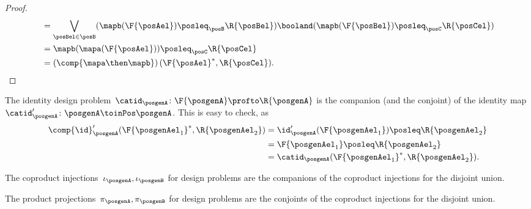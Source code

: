 \begin{proof}
\begin{equation}
\begin{aligned}
            &=\bigvee_{\posBel\in \posB} (\mapb(\F{\posAel})\posleq_\posB \R{\posBel})\booland (\mapb(\F{\posBel})\posleq_\posC \R{\posCel})\\
            &=\mapb(\mapa(\F{\posAel}))\posleq_\posC \R{\posCel}\\
            &=\left(\comp{\mapa\then \mapb}\right)(\F{\posAel}^*,\R{\posCel}).
        \end{aligned}
    \end{equation}
\end{proof}

\begin{example}
    The identity design problem~$\catid_\posgenA\colon \F{\posgenA} \profto \R{\posgenA}$ is the companion (and the conjoint) of the identity map~$\catid_\posgenA'\colon \posgenA \toinPos \posgenA$.
    This is easy to check, as
    \begin{equation}
        \begin{aligned}
            \comp{\id}_\posgenA'(\F{\posgenAel_1}^*,\R{\posgenAel_2})&=\id_\posgenA'(\F{\posgenAel_1})\posleq \R{\posgenAel_2}\\
            &=\F{\posgenAel_1}\posleq \R{\posgenAel_2}\\
            &=\catid_\posgenA(\F{\posgenAel_1}^*,\R{\posgenAel_2}).
        \end{aligned}
    \end{equation}
\end{example}

\begin{example}
    The coproduct injections~$\iota_\posgenA, \iota_\posgenB$ for design problems are the companions of the coproduct injections for the disjoint union.
\end{example}

\begin{example}
    The product projections~$\pi_\posgenA, \pi_\posgenB$ for design problems are the conjoints of the coproduct injections for the disjoint union.
\end{example}

